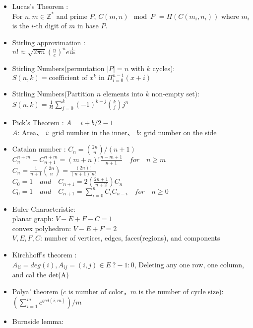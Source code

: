 \begin{itemize}
    \item Lucas's Theorem :\\
      For $n, m \in \mathbb{Z}^{*}$ and prime $P$,
      $C(m,n) \mod P$
        $= \Pi ( C(m_i,n_i) )$
      where $m_i$ is the $i$-th digit of $m$ in base $P$.
    \item Stirling approximation : \\
      $n!\approx\sqrt{ 2 \pi n}(\frac{n}{e})^{n}e^\frac{1}{12n}$
    \item Stirling Numbers(permutation $|P|=n$ with $k$ cycles): \\
      $S(n,k) = \text{coefficient of }x^k \text{ in } \Pi_{i=0}^{n-1} (x+i)$
    \item Stirling Numbers(Partition $n$ elements into $k$ non-empty set): \\
      $S(n,k) = \frac{1}{k!} \sum\limits_{j=0}^k (-1)^{k-j} {k \choose j} j^n$
    \item Pick's Theorem : $A = i + b/2 - 1$\\
      $A$: Area、 $i$: grid number in the inner、 $b$: grid number on the side
    \item Catalan number : $C_n = {2n \choose n}/(n+1)$\\
      $C^{n+m}_{n}-C^{n+m}_{n+1} = (m+n)! \frac{n-m+1}{n+1}\quad for \quad  n \ge m$\\
      $C_n = \frac{1}{n+1}{2n \choose n} = \frac{(2n)!}{(n+1)!n!}$\\
      $C_0 = 1 \quad  and \quad C_{n+1}= 2(\frac{2n+1}{n+2})C_n$\\
      $C_0 = 1 \quad  and \quad C_{n+1} = \sum_{i=0}^{n} C_iC_{n-i} \quad for \quad  n \ge 0$
    \item Euler Characteristic: \\
      planar graph: $V-E+F-C=1$ \\
      convex polyhedron: $V-E+F=2$ \\
      $V,E,F,C$: number of vertices, edges, faces(regions), and components
    \item Kirchhoff's theorem : \\
      $A_{ii} = deg(i), A_{ij} = (i,j) \in E\ ? -1 : 0$,
      Deleting any one row, one column, and cal the det(A)
    \item Polya' theorem ($c$ is number of color，$m$ is the number of cycle size): \\
      $(\sum_{i=1}^{m}{c^{gcd(i,m)}})/m$
    \item Burnside lemma: \\

\end{itemize}
